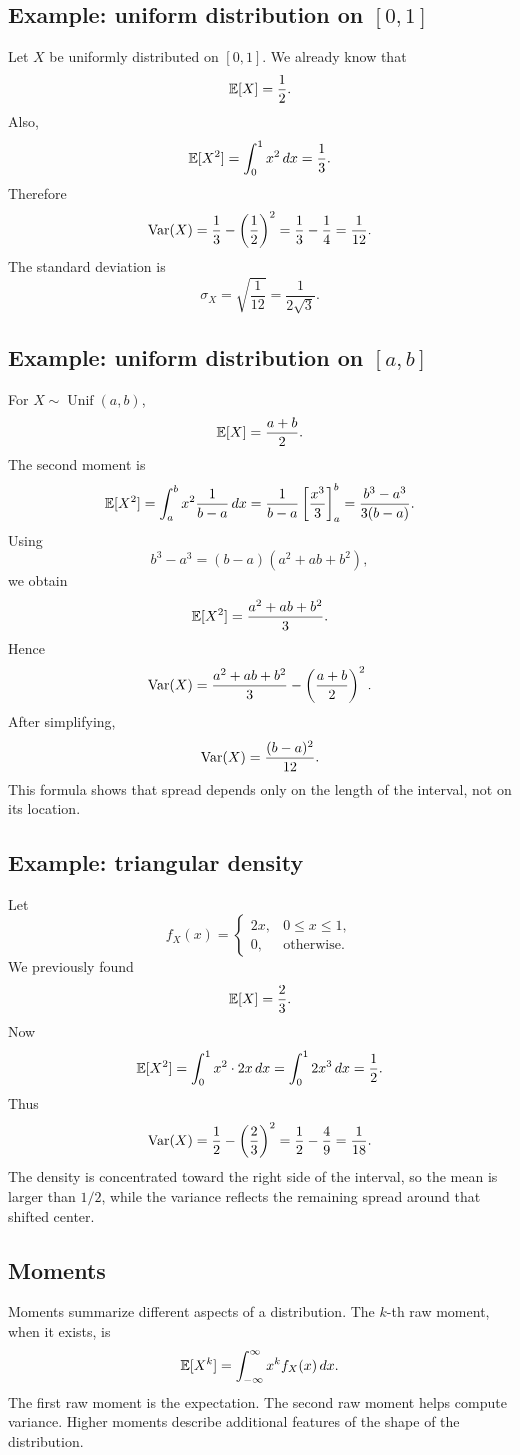 \subsection*{Example: uniform distribution on \([0,1]\)}

Let \(X\) be uniformly distributed on \([0,1]\). We already know that
\[
\mathbb{E}[X]=\frac12.
\]
Also,
\[
\mathbb{E}[X^2]=\int_0^1 x^2\,dx=\frac13.
\]
Therefore
\[
\operatorname{Var}(X)=\frac13-\left(\frac12\right)^2=
\frac13-\frac14=\frac1{12}.
\]
The standard deviation is
\[
\sigma_X=\sqrt{\frac1{12}}=\frac1{2\sqrt3}.
\]

\subsection*{Example: uniform distribution on \([a,b]\)}

For \(X\sim \operatorname{Unif}(a,b)\),
\[
\mathbb{E}[X]=\frac{a+b}{2}.
\]
The second moment is
\[
\mathbb{E}[X^2]=\int_a^b x^2\frac1{b-a}\,dx
=\frac1{b-a}\left[\frac{x^3}{3}\right]_a^b
=\frac{b^3-a^3}{3(b-a)}.
\]
Using
\[
b^3-a^3=(b-a)(a^2+ab+b^2),
\]
we obtain
\[
\mathbb{E}[X^2]=\frac{a^2+ab+b^2}{3}.
\]
Hence
\[
\operatorname{Var}(X)=\frac{a^2+ab+b^2}{3}-\left(\frac{a+b}{2}\right)^2.
\]
After simplifying,
\[
\operatorname{Var}(X)=\frac{(b-a)^2}{12}.
\]
This formula shows that spread depends only on the length of the interval, not
on its location.

\subsection*{Example: triangular density}

Let
\[
f_X(x)=
\begin{cases}
2x, & 0\leq x\leq1,\\
0, & \text{otherwise}.
\end{cases}
\]
We previously found
\[
\mathbb{E}[X]=\frac23.
\]
Now
\[
\mathbb{E}[X^2]=\int_0^1 x^2\cdot2x\,dx=\int_0^1 2x^3\,dx=\frac12.
\]
Thus
\[
\operatorname{Var}(X)=\frac12-\left(\frac23\right)^2
=\frac12-\frac49=\frac1{18}.
\]
The density is concentrated toward the right side of the interval, so the mean is
larger than \(1/2\), while the variance reflects the remaining spread around
that shifted center.

\subsection*{Moments}

Moments summarize different aspects of a distribution. The \(k\)-th raw moment,
when it exists, is
\[
\mathbb{E}[X^k]=\int_{-\infty}^{\infty}x^k f_X(x)\,dx.
\]
The first raw moment is the expectation. The second raw moment helps compute
variance. Higher moments describe additional features of the shape of the
distribution.

